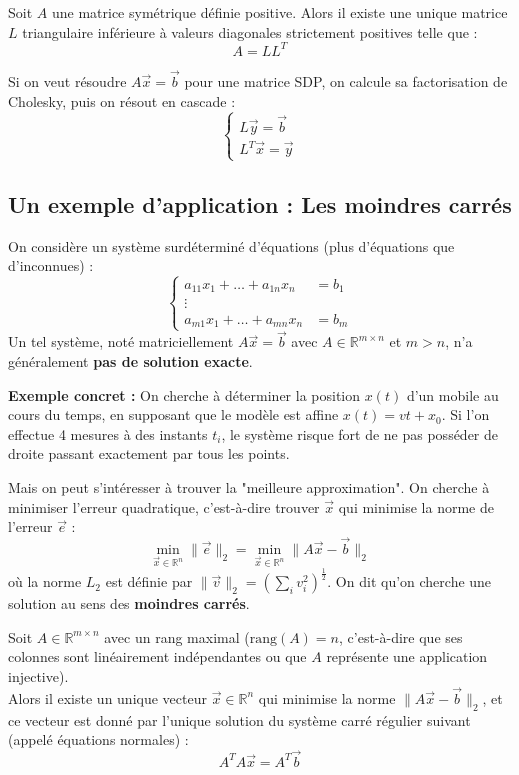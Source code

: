 \begin{theoreme}
Soit $A$ une matrice symétrique définie positive. Alors il existe une unique matrice $L$ triangulaire inférieure à valeurs diagonales strictement positives telle que :
\[ A = LL^T \]
\end{theoreme}

Si on veut résoudre $A\vec{x} = \vec{b}$ pour une matrice SDP, on calcule sa factorisation de Cholesky, puis on résout en cascade :
\[
\begin{cases}
L\vec{y} = \vec{b} \\
L^T\vec{x} = \vec{y}
\end{cases}
\]

\subsection{Un exemple d'application : Les moindres carrés}

On considère un système surdéterminé d'équations (plus d'équations que d'inconnues) :
\[
\begin{cases}
a_{11}x_1 + \dots + a_{1n}x_n &= b_1 \\
\vdots \\
a_{m1}x_1 + \dots + a_{mn}x_n &= b_m
\end{cases}
\]
Un tel système, noté matriciellement $A\vec{x} = \vec{b}$ avec $A \in \mathbb{R}^{m \times n}$ et $m > n$, n'a généralement \textbf{pas de solution exacte}.

\textbf{Exemple concret :} On cherche à déterminer la position $x(t)$ d'un mobile au cours du temps, en supposant que le modèle est affine $x(t) = vt + x_0$. Si l'on effectue 4 mesures à des instants $t_i$, le système risque fort de ne pas posséder de droite passant exactement par tous les points.

Mais on peut s'intéresser à trouver la "meilleure approximation". On cherche à minimiser l'erreur quadratique, c'est-à-dire trouver $\vec{x}$ qui minimise la norme de l'erreur $\vec{e}$ :
\[ \min_{\vec{x} \in \mathbb{R}^n} \|\vec{e}\|_2 = \min_{\vec{x} \in \mathbb{R}^n} \|A\vec{x} - \vec{b}\|_2 \]
où la norme $L_2$ est définie par $\|\vec{v}\|_2 = \left(\sum_{i} v_i^2\right)^{\frac{1}{2}}$. On dit qu'on cherche une solution au sens des \textbf{moindres carrés}.

\begin{theoreme}
Soit $A \in \mathbb{R}^{m \times n}$ avec un rang maximal ($\text{rang}(A) = n$, c'est-à-dire que ses colonnes sont linéairement indépendantes ou que $A$ représente une application injective). \\
Alors il existe un unique vecteur $\vec{x} \in \mathbb{R}^n$ qui minimise la norme $\|A\vec{x} - \vec{b}\|_2$, et ce vecteur est donné par l'unique solution du système carré régulier suivant (appelé équations normales) :
\[ A^T A \vec{x} = A^T \vec{b} \]
\end{theoreme}